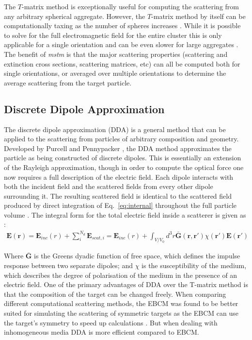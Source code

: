 The $T$-matrix method is exceptionally useful for computing the 
scattering from any arbitrary spherical aggregate. However, the 
$T$-matrix method by itself can be computationally taxing as the 
number of spheres increases \cite{Mackowski2011}. While it is 
possible to solve for the full electromagnetic field for the 
entire cluster this is only applicable for a single orientation 
and can be even slower for large aggregates \cite{Mackowski1996, 
	Xu1995}. The benefit of \textit{mstm} is that the major scattering 
properties (scattering and extinction cross sections, scattering 
matrices, etc) can all be computed both for single orientations, 
or averaged over multiple orientations to determine the average 
scattering from the target particle. 

\subsection{Discrete Dipole Approximation}
The discrete dipole approximation (DDA) is a general method that 
can be applied to the scattering from particles of arbitrary 
composition and geometry. Developed by Purcell and Pennypacker 
\cite{Purcell1973}, the DDA method approximates the particle as 
being constructed of discrete dipoles. This is essentially an 
extension of the Rayleigh approximation, though in order to compute 
the optical force one now requires a full description of the electric 
field. Each dipole interacts with both the incident field and the 
scattered fields from every other dipole surrounding it. The 
resulting scattered field is identical to the scattered field 
produced by direct integration of Eq.~\eqref{eq:internal} 
throughout the full particle volume \cite{Goedecke1988}. The 
integral form for the total electric field inside a scatterer is 
given as \cite{Wriedt1998}:
\begin{align}
	\mathbf{E(r)} = \mathbf{E}_{inc}(r) + \sum^{N_d}_{i}\mathbf{E}_{scat,i} =  
	\mathbf{E}_{inc}(r) + \int_{V/V_0}d^3r\mathbf{\bar{G}(r,r')}
	\chi(\mathbf{r'})\mathbf{E(r')}
	\label{eq:DDA}
\end{align}

Where $\mathbf{\bar{G}}$ is the Greens dyadic function of free space, 
which defines the impulse response between two separate dipoles; and 
$\chi$ is the susceptibility of the medium, which describes the 
degree of polarisation of the medium in the presence of an electric 
field. One of the primary advantages of DDA over the T-matrix method 
is that the composition of the target can be changed freely. When 
comparing different computational scattering methods, the EBCM was 
found to be better suited for simulating the scattering of symmetric
targets as the EBCM can use the target's symmetry to speed up 
calculations \cite{Wriedt1998}. But when dealing with inhomogeneous 
media DDA is more efficient compared to EBCM. 

